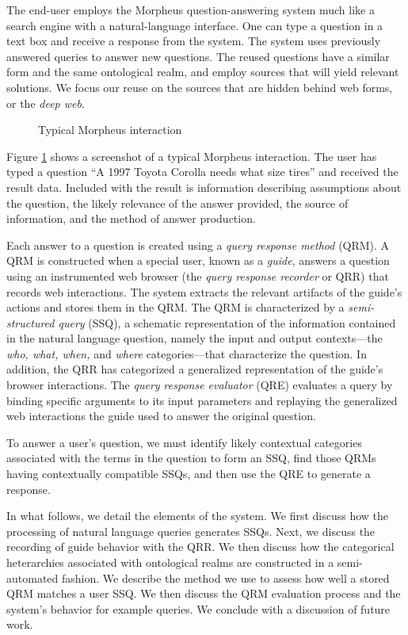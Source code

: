 
The end-user employs the Morpheus question-answering system much like a search engine with a natural-language interface. One can type a question in a text box and receive a response from the system. The system uses previously answered queries to answer new questions.  The reused questions have a similar form and the same ontological realm, and employ sources that will yield relevant solutions.  We focus our reuse on the sources that are hidden behind web forms, or the \emph{deep web}.

\begin{figure}
\caption{Typical Morpheus interaction}
\label{fig:screenshot}
\end{figure}

Figure \ref{fig:screenshot} shows a screenshot of a typical Morpheus
interaction. The user has typed a question ``A 1997 Toyota Corolla needs what size tires'' and
received the result data.  Included with the result is information describing assumptions about the question, the likely relevance of the answer provided,
the source of information, and the method of answer production.

Each answer to a question is created using a \emph{query response
  method} (QRM). A QRM is constructed when a special user, known as a
\emph{guide}, answers a question using an instrumented web browser (the
\emph{query response recorder} or QRR) that records web
interactions. The system extracts the relevant artifacts of the
guide's actions and stores them in the QRM. The QRM is characterized
by a \emph{semi-structured query} (SSQ), a schematic representation of
the information contained in the natural language question, namely the input and output
contexts---the \emph{who, what, when,} and \emph{where}
categories---that characterize the question.  In addition, the QRR has categorized a generalized representation of the guide's browser
interactions.  The \emph{query response evaluator} (QRE) evaluates a
query by binding specific arguments to its input parameters and
replaying the generalized web interactions the guide used to answer
the original question.

To answer a user's question, we must identify likely contextual
categories associated with the terms in the question to form an SSQ,
find those QRMs having contextually compatible SSQs, and then use the QRE to
generate a response.


In what follows, we detail the elements of the system.  We first
discuss how the processing of natural language queries generates SSQs.
Next, we discuss the recording of guide behavior with the QRR.  We
then discuss how the categorical heterarchies associated with
ontological realms are constructed in a semi-automated fashion.  We
describe the method we use to assess how well a stored QRM matches a
user SSQ.  We then discuss the QRM evaluation process and the
system's behavior for example queries. We conclude with a discussion of
future work.
 
